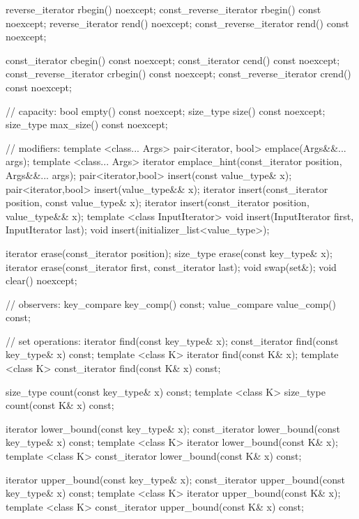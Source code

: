 \begin{codeblock}
{{    reverse_iterator       rbegin() noexcept;
    const_reverse_iterator rbegin() const noexcept;
    reverse_iterator       rend() noexcept;
    const_reverse_iterator rend() const noexcept;

    const_iterator         cbegin() const noexcept;
    const_iterator         cend() const noexcept;
    const_reverse_iterator crbegin() const noexcept;
    const_reverse_iterator crend() const noexcept;

    // capacity:
    bool          empty() const noexcept;
    size_type     size() const noexcept;
    size_type     max_size() const noexcept;

    // modifiers:
    template <class... Args> pair<iterator, bool> emplace(Args&&... args);
    template <class... Args> iterator emplace_hint(const_iterator position, Args&&... args);
    pair<iterator,bool> insert(const value_type& x);
    pair<iterator,bool> insert(value_type&& x);
    iterator insert(const_iterator position, const value_type& x);
    iterator insert(const_iterator position, value_type&& x);
    template <class InputIterator>
      void insert(InputIterator first, InputIterator last);
    void insert(initializer_list<value_type>);

    iterator  erase(const_iterator position);
    size_type erase(const key_type& x);
    iterator  erase(const_iterator first, const_iterator last);
    void swap(set&);
    void clear() noexcept;

    // observers:
    key_compare   key_comp() const;
    value_compare value_comp() const;

    // set operations:
    iterator        find(const key_type& x);
    const_iterator  find(const key_type& x) const;
    template <class K> iterator       find(const K& x);
    template <class K> const_iterator find(const K& x) const;

    size_type count(const key_type& x) const;
    template <class K> size_type count(const K& x) const;

    iterator        lower_bound(const key_type& x);
    const_iterator  lower_bound(const key_type& x) const;
    template <class K> iterator       lower_bound(const K& x);
    template <class K> const_iterator lower_bound(const K& x) const;

    iterator        upper_bound(const key_type& x);
    const_iterator  upper_bound(const key_type& x) const;
    template <class K> iterator       upper_bound(const K& x);
    template <class K> const_iterator upper_bound(const K& x) const;

}}
\end{codeblock}
